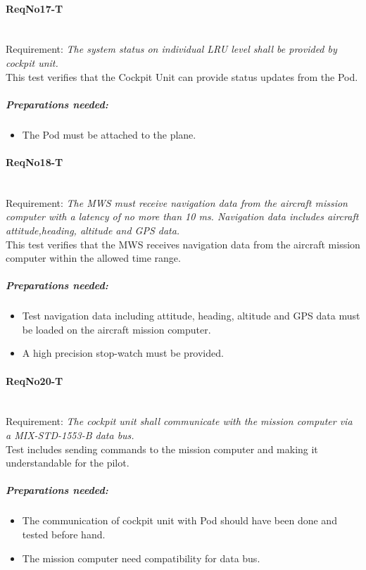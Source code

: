 \paragraph{ReqNo17-T}\mbox{}\\ %
Requirement: \textit{The system status on individual LRU level shall be
provided by cockpit unit.}\\
This test verifies that the Cockpit Unit can provide status updates from the Pod.\\

	\subparagraph{Preparations needed:}
	\begin{itemize}
	\item The Pod must be attached to the plane.
	\end{itemize}


\paragraph{ReqNo18-T}\mbox{}\\ %
Requirement: \textit{The MWS must receive navigation data from the aircraft mission computer with a latency of no more than
10 ms. Navigation data includes aircraft attitude,heading, altitude and GPS data.}\\

This test verifies that the MWS receives navigation data from the aircraft mission computer within the allowed time range.

	\subparagraph{Preparations needed:}
	\begin{itemize}
	\item Test navigation data including attitude, heading, altitude and GPS data must be loaded on the aircraft mission computer.
	\item A high precision stop-watch must be provided.
	\end{itemize}

\paragraph{ReqNo20-T}\mbox{}\\ %
Requirement: \textit{The cockpit unit shall communicate with the mission computer via a MIX-STD-1553-B data bus.}\\
Test includes sending commands to the mission computer and making it understandable for the pilot.
	\subparagraph{Preparations needed:}
	\begin{itemize}
	\item The communication of cockpit unit with Pod should have been done and tested before hand.
	\item The mission computer need compatibility for data bus.
	\end{itemize}

